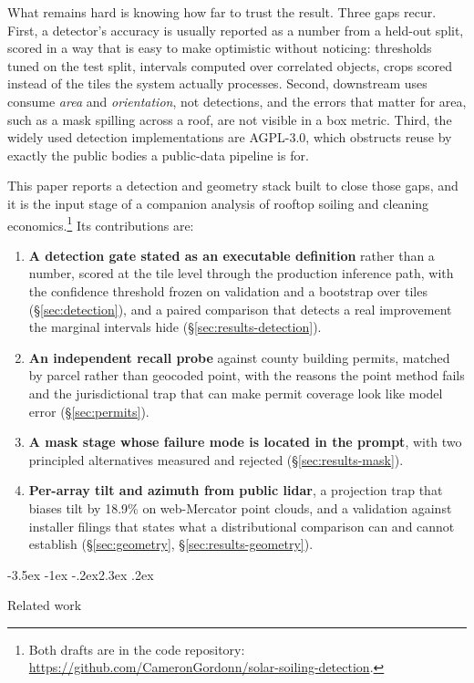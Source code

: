 \documentclass[10pt,twocolumn]{article}
\makeatletter
\renewcommand\section{\@startsection{section}{1}{\z@}%
  {-3.5ex \@plus -1ex \@minus -.2ex}{2.3ex \@plus.2ex}%
  {\normalfont\Large\bfseries\raggedright}}
\makeatother
\begin{document}
What remains hard is knowing how far to trust the result. Three gaps recur. First, a
detector's accuracy is usually reported as a number from a held-out split, scored in a way
that is easy to make optimistic without noticing: thresholds tuned on the test split,
intervals computed over correlated objects, crops scored instead of the tiles the system
actually processes. Second, downstream uses consume \emph{area} and \emph{orientation},
not detections, and the errors that matter for area, such as a mask spilling across a
roof, are not visible in a box metric. Third, the widely used detection implementations
are AGPL-3.0, which obstructs reuse by exactly the public bodies a public-data pipeline is
for.

This paper reports a detection and geometry stack built to close those gaps, and it is the
input stage of a companion analysis of rooftop soiling and cleaning
economics.\footnote{Both drafts are in the code repository:
\url{https://github.com/CameronGordonn/solar-soiling-detection}.} Its contributions are:

\begin{enumerate}\itemsep2pt
\item \textbf{A detection gate stated as an executable definition} rather than a number,
scored at the tile level through the production inference path, with the confidence
threshold frozen on validation and a bootstrap over tiles (\S\ref{sec:detection}), and a
paired comparison that detects a real improvement the marginal intervals hide
(\S\ref{sec:results-detection}).
\item \textbf{An independent recall probe} against county building permits, matched by
parcel rather than geocoded point, with the reasons the point method fails and the
jurisdictional trap that can make permit coverage look like model error
(\S\ref{sec:permits}).
\item \textbf{A mask stage whose failure mode is located in the prompt}, with two
principled alternatives measured and rejected (\S\ref{sec:results-mask}).
\item \textbf{Per-array tilt and azimuth from public lidar}, a projection trap that biases
tilt by 18.9\% on web-Mercator point clouds, and a validation against installer filings
that states what a distributional comparison can and cannot establish
(\S\ref{sec:geometry}, \S\ref{sec:results-geometry}).
\end{enumerate}

\section{Related work}
\label{sec:related}
\end{document}
